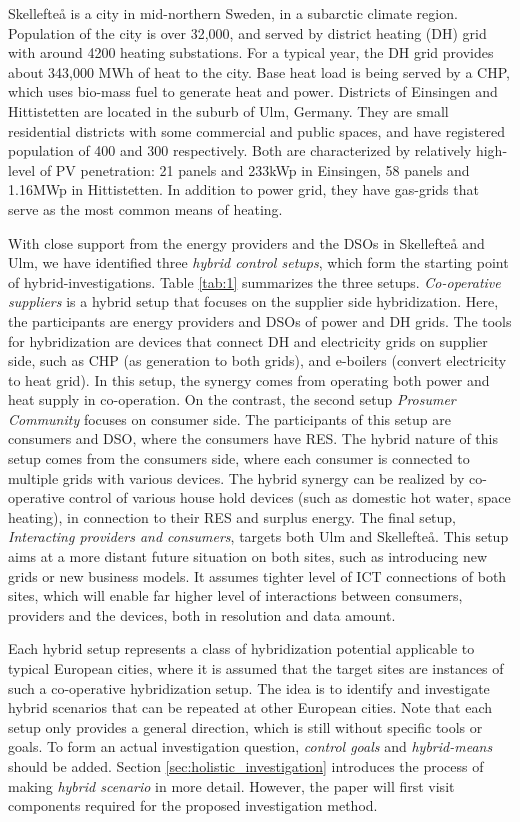 \documentclass[review]{elsarticle}
\begin{document}
Skellefte{\aa}  is a city in mid-northern Sweden, in a subarctic
climate region. Population of the city is over 32,000, and served by
district heating (DH) grid with around 4200 heating substations. For a 
typical year, the DH grid provides about 343,000 MWh of heat to the 
city. Base heat load is being served by a CHP, which uses bio-mass
fuel to generate heat and power. 
Districts of Einsingen and Hittistetten are located in the suburb of
Ulm, Germany. They are small residential districts with some
commercial and  public spaces, and have registered population of 400
and 300 respectively. Both are characterized by relatively high-level
of PV penetration: 21 panels and 233kWp in Einsingen, 58 panels and 
1.16MWp in Hittistetten. In addition to power grid, they have
gas-grids that serve as the most common means of heating.  

With close support from the energy providers and the DSOs 
in Skellefte{\aa} and Ulm, we have identified three {\em hybrid
  control setups}, which form the starting point of
hybrid-investigations.    
Table \ref{tab:1} summarizes the three setups. {\em Co-operative
  suppliers} is a hybrid setup that focuses on the supplier side
hybridization. Here, the participants are energy providers and DSOs of  
power and DH grids. The tools for hybridization are devices that
connect DH and electricity grids on supplier side,
such as CHP (as generation to both grids), and e-boilers (convert
electricity to heat grid). In this setup, the synergy comes from
operating both power and heat supply in co-operation. 
On the contrast, the second setup {\em Prosumer Community} focuses on
consumer side. The participants of this setup are consumers and DSO,
where the consumers have RES. The hybrid nature of this setup comes
from the consumers side, where each consumer is connected to multiple
grids with various devices. The hybrid synergy can be realized by
co-operative control of various house hold devices (such as domestic
hot water, space heating), in connection to their RES and surplus
energy. 
The final setup, {\em Interacting providers and consumers}, targets
both Ulm and Skellefte{\aa}. This setup aims at a more distant future
situation on both sites, such as introducing new grids or new business
models. It assumes tighter level of ICT connections of both sites,
which will enable far higher level of interactions between consumers,
providers and the devices, both in resolution and data amount.   

Each hybrid setup represents a class of hybridization potential
applicable to typical European cities, where it is assumed that the
target sites are instances of such a co-operative hybridization setup. 
The idea is to identify and investigate hybrid scenarios that can be
repeated at other European cities. Note that each setup only provides
a general direction, which is still without specific tools or
goals. To form an actual investigation question,  {\em control
  goals} and {\em hybrid-means} should be added. 
Section \ref{sec:holistic_investigation} introduces the process of
making {\em hybrid scenario} in more detail. However, the paper will
first visit components required for the proposed investigation
method. 
\end{document}
